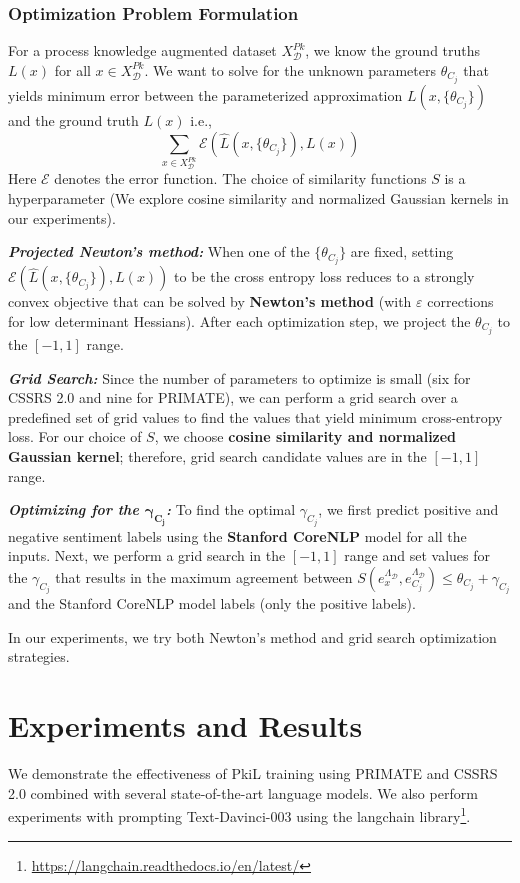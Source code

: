 \documentclass[letterpaper]{article} %
\begin{document}
\subsubsection{Optimization Problem Formulation}
For a process knowledge augmented dataset $X^{Pk}_{\mathcal{D}}$, we know the ground truths $L(x)$ for all $x \in X^{Pk}_{\mathcal{D}}$. We want to solve for the unknown parameters $\theta_{C_j}$ that yields minimum error between the parameterized approximation $L(x,\{\theta_{C_j}\})$ and the ground truth $L(x)$ i.e., \[\sum_{x\in X^{Pk}_{\mathcal{D}}}\mathcal{E}(\hat{L}(x,\{\theta_{C_j}\}),L(x))\]
Here $\mathcal{E}$ denotes the error function. The choice of similarity functions $S$ is a hyperparameter (We explore cosine similarity and normalized Gaussian kernels in our experiments).

\textit{\textbf{Projected Newton's method:}} When one of the $\{\theta_{C_j}\}$ are fixed, setting $\mathcal{E}(\hat{L}(x,\{\theta_{C_j}\}), L(x))$ to be the cross entropy loss reduces to a strongly convex objective that can be solved by \textbf{Newton's method} (with $\varepsilon$ corrections for low determinant Hessians). After each optimization step, we project the $\theta_{C_j}$ to the $[-1,1]$ range.

\textit{\textbf{Grid Search:}} Since the number of parameters to optimize is small (six for CSSRS 2.0 and nine for PRIMATE), we can perform a grid search over a predefined set of grid values to find the values that yield minimum cross-entropy loss. For our choice of $S$, we choose \textbf{cosine similarity and normalized Gaussian kernel}; therefore, grid search candidate values are in the $[-1,1]$ range.

\textit{\textbf{Optimizing for the $\mathbf{\gamma_{C_j}}$:}} To find the optimal $\gamma_{C_j}$, we first predict positive and negative sentiment labels using the \textbf{Stanford CoreNLP} model for all the inputs.  Next, we perform a grid search in the $[-1,1]$ range and set values for the $\gamma_{C_j}$ that results in the maximum agreement between $S(e^{\Lambda_{\mathcal{D}}}_x, e^{\Lambda_{\mathcal{D}}}_{C_j}) \leq \theta_{C_j} + \gamma_{C_j}$ and the Stanford CoreNLP model labels (only the positive labels).

In our experiments, we try both Newton's method and grid search optimization strategies.

\section{Experiments and Results}
We demonstrate the effectiveness of PkiL training using PRIMATE and CSSRS 2.0 combined with several state-of-the-art language models. We also perform experiments with prompting Text-Davinci-003 using the langchain library\footnote{\url{https://langchain.readthedocs.io/en/latest/}}.
\end{document}
